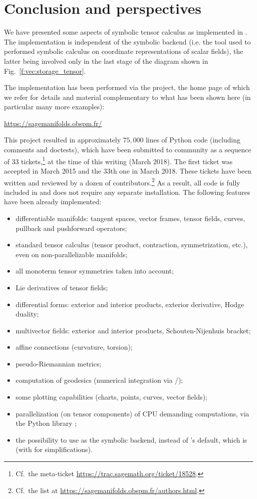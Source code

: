 \chapter{Conclusion and perspectives} \label{s:con}

We have presented some aspects of symbolic tensor calculus as implemented
in \Sage{}. The implementation is independent of the symbolic backend (i.e. the
tool used to performed symbolic calculus on coordinate representations of
scalar fields), the latter being involved only in the last stage of the diagram
shown in Fig.~\ref{f:vec:storage_tensor}.

The implementation has been performed via the 
project, the home page of which we refer for details and material complementary
to what has been shown here (in particular many more examples):
\begin{center}
\url{https://sagemanifolds.obspm.fr/}
\end{center}
This project resulted in approximately $75,000$ lines of Python code (including comments and doctests), which have been submitted to \Sage{} community as a sequence of
33 tickets,\footnote{Cf.\ the meta-ticket \url{https://trac.sagemath.org/ticket/18528}.}
at the time of this writing (March 2018). The
first ticket was accepted in March 2015 and the 33th one in March 2018.
These tickets have been written and reviewed by a dozen of
contributors.\footnote{Cf.\ the list at \url{https://sagemanifolds.obspm.fr/authors.html}.}
As a result, all code is fully included in  and does not require
any separate installation. The following features have been already implemented:
\begin{itemize}
\item differentiable manifolds: tangent spaces, vector frames, tensor fields, curves, pullback and pushforward operators;
\item standard tensor calculus (tensor product, contraction, symmetrization, etc.), even on non-parallelizable manifolds;
\item all monoterm tensor symmetries taken into account;
\item Lie derivatives of tensor fields;
\item differential forms: exterior and interior products, exterior derivative,
Hodge duality;
\item multivector fields: exterior and interior products, Schouten-Nijenhuis bracket;
\item affine connections (curvature, torsion);
\item pseudo-Riemannian metrics;
\item computation of geodesics (numerical integration via \Sage{}/);
\item some plotting capabilities (charts, points, curves, vector fields);
\item parallelization (on tensor components) of CPU demanding computations,
via the Python library ;
\item the possibility to use  as the symbolic backend, instead of
\Sage{}'s default, which is  (with  for simplifications).
\end{itemize}
